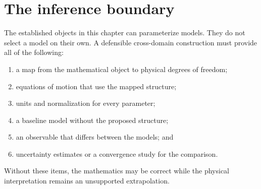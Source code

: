 \section{The inference boundary}

The established objects in this chapter can parameterize models. They do not
select a model on their own. A defensible cross-domain construction must provide
all of the following:

\begin{enumerate}
  \item a map from the mathematical object to physical degrees of freedom;
  \item equations of motion that use the mapped structure;
  \item units and normalization for every parameter;
  \item a baseline model without the proposed structure;
  \item an observable that differs between the models; and
  \item uncertainty estimates or a convergence study for the comparison.
\end{enumerate}

Without these items, the mathematics may be correct while the physical
interpretation remains an unsupported extrapolation.

